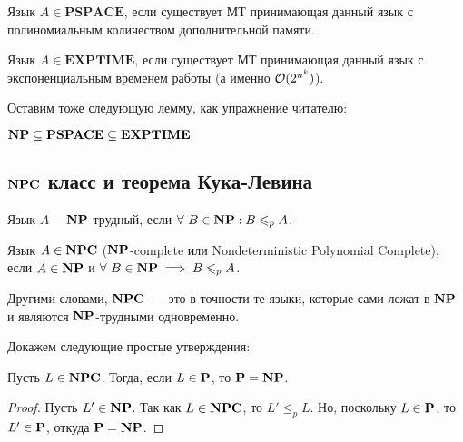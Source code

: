 \begin{Def}
  Язык $A \in \mathbf{PSPACE}$, если существует МТ принимающая данный язык
  с полиномиальным количеством дополнительной памяти.
\end{Def}

\begin{Def}
  Язык $A \in \mathbf{EXPTIME}$, если существует МТ принимающая данный язык
  с экспоненциальным временем работы (а именно $\mathcal{O}(2^{n^k})$).
\end{Def}

Оставим тоже следующую лемму, как упражнение читателю:

\begin{Lemma}
  $\mathbf{NP} \subseteq \mathbf{PSPACE} \subseteq \mathbf{EXPTIME}$ 
\end{Lemma}

\subsection{$\mathbf{NPC}$ класс и теорема Кука-Левина}

\begin{Def}
  Язык $A$--- $\mathbf{NP}$-трудный, если $\forall \ B \in \mathbf{NP} : B \leqslant_p A$.
\end{Def}

\begin{Def}
  Язык $A \in \mathbf{NPC}$ ($\mathbf{NP}$-complete или Nondeterministic Polynomial 
  Complete), если $A \in \mathbf{NP}$ и $\forall \ B \in \mathbf{NP} \implies B
  \leqslant_p A$.
\end{Def}

Другими словами, $\mathbf{NPC}$~--- это в точности те языки, которые
сами лежат в $\mathbf{NP}$ и являются $\mathbf{NP}$-трудными одновременно.

Докажем следующие простые утверждения:

\begin{Lemma}
  Пусть $L \in \mathbf{NPC}$. Тогда, если $L \in \mathbf{P}$, то $\mathbf{P} = \mathbf{NP}$.
\end{Lemma}
\begin{proof}
  Пусть $L' \in \mathbf{NP}$. Так как $L \in \mathbf{NPC}$, то $L' \leqslant_p L$.
  Но, поскольку $L \in \mathbf{P}$, то $L' \in \mathbf{P}$, откуда $\mathbf{P} = \mathbf{NP}$.
\end{proof}

